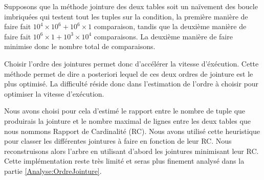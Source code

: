 \documentclass[12pt,a4paper]{article}
\begin{document}
\begin{minipage}{0.48\textwidth}
\end{minipage}
\vspace{1cm}
Supposons que la méthode jointure des deux tables soit un naïvement des boucle imbriquées qui testent tout les tuples sur la condition, la première manière de faire fait \(10^4\times10^6 + 10^6 \times 1 \) comparaison, tandis que la deuxième manière de faire fait \( 10^6 \times 1 + 10^3 \times 10^4 \) comparaisons. La deuxième manière de faire minimise donc le nombre total de comparaisons.

Choisir l'ordre des jointures permet donc d'accélérer la vitesse d'éxécution. Cette méthode permet de dire a posteriori lequel de ces deux ordres de jointure est le plus optimisé. La difficulté réside donc dans l'estimation de l'ordre à choisir pour optimiser la vitesse d'exécution. 


Nous avons choisi pour cela d'estimé le rapport entre le nombre de tuple que produirais la jointure et le nombre maximal de lignes entre les deux tables que nous nommons Rapport de Cardinalité (RC). Nous avons utilisé cette heuristique pour classer les différentes jointures à faire en fonction de leur RC. Nous reconstruisons alors l'arbre en utilisant d'abord les jointures minimisant leur RC.
Cette implémentation reste très limité et seras plus finement analysé dans la partie \ref{Analyse:OrdreJointure}.
\end{document}

